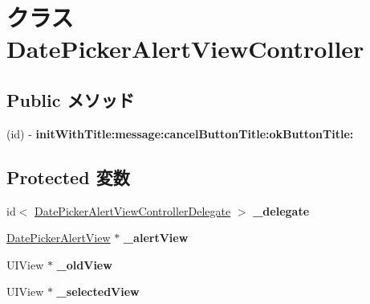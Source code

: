 \hypertarget{interface_date_picker_alert_view_controller}{
\section{クラス DatePickerAlertViewController}
\label{interface_date_picker_alert_view_controller}
}
\subsection*{Public メソッド}
\begin{DoxyCompactItemize}
\item 
\hypertarget{interface_date_picker_alert_view_controller_aeeef1e43f0acbef356e2612b730ceea3}{
(id) -\/ {\bfseries initWithTitle:message:cancelButtonTitle:okButtonTitle:}}
\label{interface_date_picker_alert_view_controller_aeeef1e43f0acbef356e2612b730ceea3}

\end{DoxyCompactItemize}
\subsection*{Protected 変数}
\begin{DoxyCompactItemize}
\item 
\hypertarget{interface_date_picker_alert_view_controller_af80bccfe259ac0f7907fbb3f623110ab}{
id$<$ \hyperlink{protocol_date_picker_alert_view_controller_delegate-p}{DatePickerAlertViewControllerDelegate} $>$ {\bfseries \_\-delegate}}
\label{interface_date_picker_alert_view_controller_af80bccfe259ac0f7907fbb3f623110ab}

\item 
\hypertarget{interface_date_picker_alert_view_controller_ae924379969d3c4411771534eb6eddf69}{
\hyperlink{interface_date_picker_alert_view}{DatePickerAlertView} $\ast$ {\bfseries \_\-alertView}}
\label{interface_date_picker_alert_view_controller_ae924379969d3c4411771534eb6eddf69}

\item 
\hypertarget{interface_date_picker_alert_view_controller_a8b6c7d66a0af5481421f00a8c46c0a97}{
UIView $\ast$ {\bfseries \_\-oldView}}
\label{interface_date_picker_alert_view_controller_a8b6c7d66a0af5481421f00a8c46c0a97}

\item 
\hypertarget{interface_date_picker_alert_view_controller_a9a66593d267ac3c78779d2dc9be9bee4}{
UIView $\ast$ {\bfseries \_\-selectedView}}
\label{interface_date_picker_alert_view_controller_a9a66593d267ac3c78779d2dc9be9bee4}

\end{DoxyCompactItemize}
